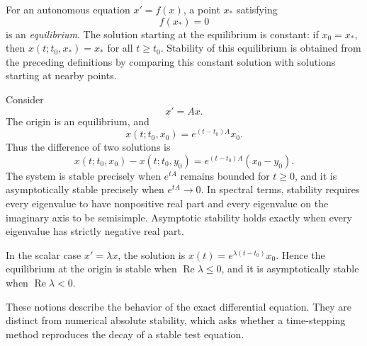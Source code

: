 For an autonomous equation \(x'=f(x)\), a point \(x_*\) satisfying
\[
  f(x_*)=0
\]
is an \emph{equilibrium}. The solution starting at the equilibrium is
constant: if \(x_0=x_*\), then \(x(t;t_0,x_*)=x_*\) for all
\(t\geq t_0\). Stability of this equilibrium is obtained from the
preceding definitions by comparing this constant solution with
solutions starting at nearby points.

\begin{example}
  Consider
  \[
    x'=Ax.
  \]
  The origin is an equilibrium, and
  \[
    x(t;t_0,x_0)=e^{(t-t_0)A}x_0.
  \]
  Thus the difference of two solutions is
  \[
    x(t;t_0,x_0)-x(t;t_0,y_0)
    =e^{(t-t_0)A}(x_0-y_0).
  \]
  The system is stable precisely when \(e^{tA}\) remains bounded for
  \(t\geq0\), and it is asymptotically stable precisely when
  \(e^{tA}\to0\). In spectral terms, stability requires every
  eigenvalue to have nonpositive real part and every eigenvalue on the
  imaginary axis to be semisimple. Asymptotic stability holds exactly
  when every eigenvalue has strictly negative real part.

  In the scalar case \(x'=\lambda x\), the solution is
  \(x(t)=e^{\lambda(t-t_0)}x_0\). Hence the equilibrium at the origin
  is stable when \(\operatorname{Re}\lambda\leq0\), and it is
  asymptotically stable when \(\operatorname{Re}\lambda<0\).
\end{example}

These notions describe the behavior of the exact differential
equation. They are distinct from numerical absolute stability, which
asks whether a time-stepping method reproduces the decay of a stable
test equation.
